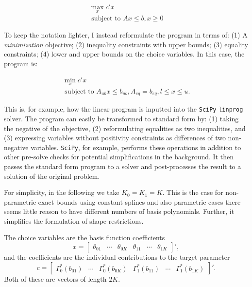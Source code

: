 \documentclass[12pt,a4paper,english]{article} %
\numberwithin{equation}{section}
\numberwithin{figure}{section}
\numberwithin{table}{section}
\begin{document}
\begin{align}
  \max_x c'x \\
  \text{ subject to } Ax\leq b, x\geq0
\end{align}

To keep the notation lighter, I instead reformulate the program in terms of:
(1) A \textit{minimization} objective; (2) inequality constraints with upper bounds; (3) equality constraints; (4) lower and upper bounds on the choice variables.
In this case, the program is:

\begin{align}
  \min_x c'x \\
  \text{ subject to } A_{ub}x \leq b_{ub}, A_{eq} = b_{eq}, l\leq x\leq u.
\end{align}

This is, for example, how the linear program is inputted into the \texttt{SciPy} \texttt{linprog} solver.
The program can easily be transformed to standard form by: (1) taking the negative of the objective, (2) reformulating equalities as two inequalities, and (3) expressing variables without positivity constraints as differences of two non-negative variables.
\texttt{SciPy}, for example, performs these operations in addition to other pre-solve checks for potential simplifications in the background.
It then passes the standard form program to a solver and post-processes the result to a solution of the original problem.

For simplicity, in the following we take $K_0 = K_1 = K$. This is the case for non-parametric exact bounds using constant splines and also parametric cases there seems little reason to have different numbers of basis polynomials.
Further, it simplifies the formulation of shape restrictions.

The choice variables are the basis function coefficients
\begin{equation*}
  x =
  \begin{bmatrix}
     \theta_{01} & \cdots & \theta_{0K} & \theta_{11} & \cdots & \theta_{1K}
  \end{bmatrix}',
\end{equation*}
and the coefficients are the individual contributions to the target parameter
\begin{equation*}
  c =
  \begin{bmatrix}
     \Gamma_0^*(b_{01}) & \cdots & \Gamma_0^*(b_{0K}) & \Gamma_1^*(b_{11}) & \cdots & \Gamma_1^*(b_{1K})
  \end{bmatrix}'.
\end{equation*}
Both of these are vectors of length $2K$.
\end{document}
